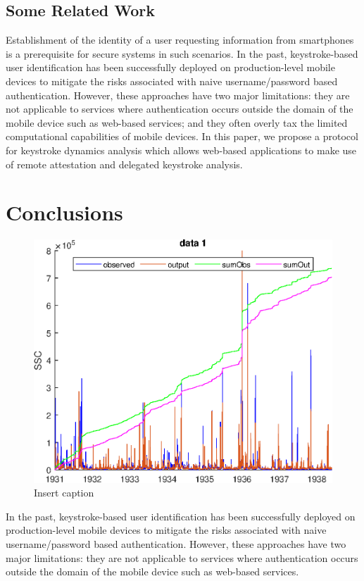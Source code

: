 \documentclass[twocolumn]{article}
\begin{document}
\subsection{Some Related Work} 
Establishment of the identity of a user requesting information from smartphones is a prerequisite for  secure systems in such scenarios. In the past, keystroke-based user identification has been successfully deployed on production-level mobile devices to mitigate the risks associated with naive username/password based authentication. However, these approaches have two major limitations: they are not applicable to services where authentication occurs outside the domain of the mobile
device such as web-based services; and they often overly tax the limited computational capabilities of mobile devices. In this paper, we propose a protocol for keystroke dynamics analysis which allows web-based applications to make use of remote attestation and delegated keystroke analysis.

\section{Conclusions}

\begin{figure}
	\centering
	\includegraphics{epsFig}
	\caption{Insert caption}
\end{figure}

In the past, keystroke-based user identification has been successfully deployed on production-level mobile devices to mitigate the risks associated with naive username/password based authentication. However, these approaches have two major limitations: they are not applicable to services where authentication occurs outside the domain of the mobile
device such as web-based services.





   
\end{document}
